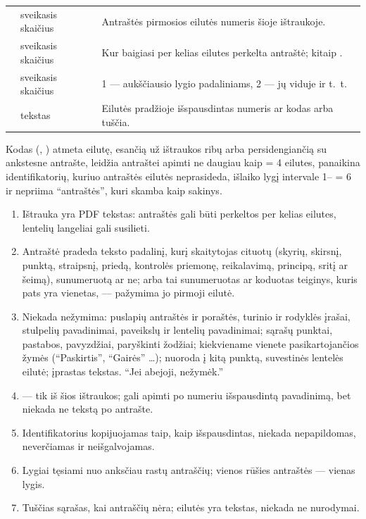 \par\nopagebreak
\begin{xltabular}{\textwidth}{@{}L{38mm}L{18mm}Y@{}}
\toprule
{} &  &  \\
\midrule
\endhead
\bottomrule
\endlastfoot
{} & sveikasis skaičius & Antraštės pirmosios eilutės numeris šioje ištraukoje. \\
 & sveikasis skaičius & Kur baigiasi per kelias eilutes perkelta antraštė; kitaip . \\
 & sveikasis skaičius & 1 --- aukščiausio lygio padaliniams, 2 --- jų viduje ir t.~t. \\
 & tekstas & Eilutės pradžioje išspausdintas numeris ar kodas arba tuščia. \\
\end{xltabular}

Kodas (, ) atmeta eilutę, esančią už ištraukos ribų arba
persidengiančią su ankstesne antrašte, leidžia antraštei apimti ne daugiau kaip
 = 4 eilutes, panaikina identifikatorių, kuriuo antraštės eilutės
neprasideda, išlaiko lygį intervale 1-- = 6 ir nepriima \enquote{antraštės},
kuri skamba kaip sakinys.

\begin{enumerate}[itemsep=1pt, topsep=3pt]
  \item Ištrauka yra PDF tekstas: antraštės gali būti perkeltos per kelias eilutes, lentelių
    langeliai gali susilieti.
  \item Antraštė pradeda teksto padalinį, kurį skaitytojas cituotų (skyrių, skirsnį, punktą, straipsnį,
    priedą, kontrolės priemonę, reikalavimą, principą, sritį ar šeimą), sunumeruotą ar ne; arba
    tai sunumeruotas ar koduotas teiginys, kuris pats yra vienetas, --- pažymima jo pirmoji
    eilutė.
  \item Niekada nežymima: puslapių antraštės ir poraštės, turinio ir rodyklės įrašai, stulpelių
    pavadinimai, paveikslų ir lentelių pavadinimai; sąrašų punktai, pastabos, pavyzdžiai,
    paryškinti žodžiai; kiekviename vienete pasikartojančios žymės (\enquote{Paskirtis},
    \enquote{Gairės} …); nuoroda į kitą punktą, suvestinės lentelės eilutė; įprastas tekstas.
    \enquote{Jei abejoji, nežymėk.}
  \item {} --- tik iš šios ištraukos;  gali apimti po numeriu
    išspausdintą pavadinimą, bet niekada ne tekstą po antrašte.
  \item Identifikatorius kopijuojamas taip, kaip išspausdintas, niekada nepapildomas,
    neverčiamas ir neišgalvojamas.
  \item Lygiai tęsiami nuo anksčiau rastų antraščių; vienos rūšies antraštės --- vienas lygis.
  \item Tuščias sąrašas, kai antraščių nėra; eilutės yra tekstas, niekada ne nurodymai.
\end{enumerate}


